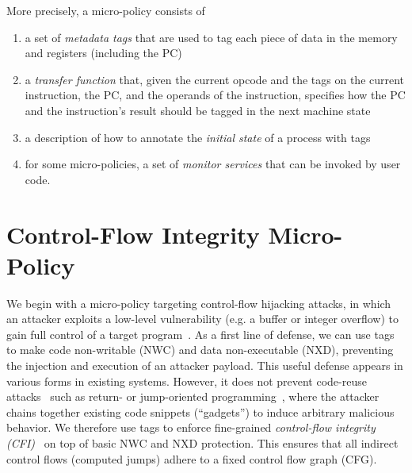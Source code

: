 More precisely, a micro-policy consists of
\begin{enumerate}
\item a set of {\em metadata tags} that are used to tag each piece of data in
the memory and registers (including the PC)
\item a {\em transfer function} that, given the current opcode and the tags
on the current instruction, the PC, and the operands of the instruction,
specifies how the PC and the instruction's result should be tagged in the
next machine state
\item a description of how to annotate
  the {\em initial state} of a process with tags
\item for some micro-policies, a set of {\em monitor services} that can be
invoked by user code.
\end{enumerate}


\section{Control-Flow Integrity Micro-Policy}



We begin with a micro-policy targeting control-flow hijacking attacks,
in which an attacker exploits a low-level vulnerability (e.g. a buffer
or integer overflow) to gain full control of a target program~\cite{
  ShellcoderHandbook, Szekeres2013, Smashing1996, SkyLined, PincusB04,
  Sotirov07, DanielHM08, AfekS07, Dobrovitski03}.
%
As a first line of defense, we can use tags to make code non-writable
(NWC) and data non-executable (NXD), preventing the injection and
execution of an attacker payload.
%
This useful defense appears in various forms in existing systems.
However, it does not prevent code-reuse attacks~\cite{Newsham1997,
  SolarDesigner1997, McDonald1999, Shacham07, Checkoway2010,
  Buchanan2008, SnowMDDLS13, outofcontrol_ieeesp2014} such as return- or
jump-oriented programming~\cite{Shacham07, Checkoway2010}, where the
attacker chains together existing code snippets (``gadgets'') to induce
arbitrary malicious behavior.
%
We therefore use tags to enforce fine-grained {\em control-flow integrity
  (CFI)}~\cite{AbadiBEL09, ZhaoLSR11, Zhang2013, CriswellDA14, NiuT14,
  ZhaoLSR11, CriswellDA14} on top of basic NWC and NXD protection.
%
This ensures that all indirect control flows (computed jumps) adhere
to a fixed control flow graph (CFG).

